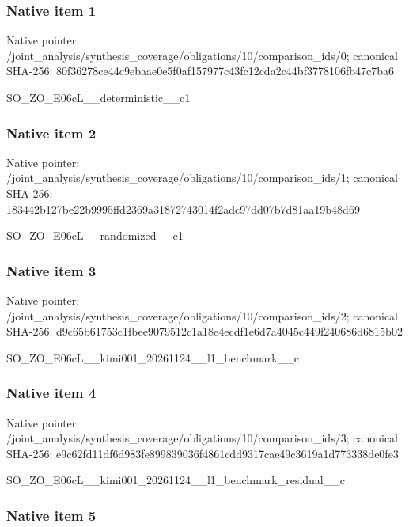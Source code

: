 \documentclass[10pt,a4paper]{article}
\begin{document}
\subsubsection{Native item 1}


Native pointer: /joint\_analysis/synthesi\allowbreak{}s\_coverage/obligations/1\allowbreak{}0/comparison\_ids/0; canonical SHA-256: 80f36278ce44c9ebaae0e5f0\allowbreak{}af157977c43fc12cda2c44bf\allowbreak{}3778106fb47c7ba6


SO\_ZO\_E06cL\_\_deterministic\_\_c1


\subsubsection{Native item 2}


Native pointer: /joint\_analysis/synthesi\allowbreak{}s\_coverage/obligations/1\allowbreak{}0/comparison\_ids/1; canonical SHA-256: 183442b127be22b9995ffd23\allowbreak{}69a31872743014f2adc97dd0\allowbreak{}7b7d81aa19b48d69


SO\_ZO\_E06cL\_\_randomized\_\_c1


\subsubsection{Native item 3}


Native pointer: /joint\_analysis/synthesi\allowbreak{}s\_coverage/obligations/1\allowbreak{}0/comparison\_ids/2; canonical SHA-256: d9c65b61753c1fbee9079512\allowbreak{}c1a18e4ecdf1e6d7a4045c44\allowbreak{}9f240686d6815b02


SO\_ZO\_E06cL\_\_kimi001\_202\allowbreak{}61124\_\_l1\_benchmark\_\_c


\subsubsection{Native item 4}


Native pointer: /joint\_analysis/synthesi\allowbreak{}s\_coverage/obligations/1\allowbreak{}0/comparison\_ids/3; canonical SHA-256: e9c62fd11df6d983fe899839\allowbreak{}036f4861cdd9317cae49c361\allowbreak{}9a1d773338de0fe3


SO\_ZO\_E06cL\_\_kimi001\_202\allowbreak{}61124\_\_l1\_benchmark\_resi\allowbreak{}dual\_\_c


\subsubsection{Native item 5}
\end{document}

